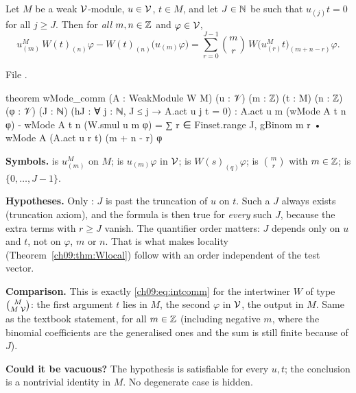 \begin{theorem}\label{ch09:thm:Wcomm}
Let $M$ be a weak $\mathcal{V}$-module, $u\in\mathcal{V}$, $t\in M$, and let $J\in{\mathbb{N}}$ be such that
$u_{(j)}t=0$ for all $j\ge J$. Then for \emph{all} $m,n\in{\mathbb{Z}}$ and $\varphi\in\mathcal{V}$,
\begin{equation}\label{ch09:eq:Wcomm}
u^M_{(m)}\,W(t)_{(n)}\varphi-W(t)_{(n)}\big(u_{(m)}\varphi\big)
=\sum_{r=0}^{J-1}\binom{m}{r}\,W\big(u^M_{(r)}t\big)_{(m+n-r)}\varphi .
\end{equation}
\end{theorem}
\noindent File .
\begin{leancode}
theorem wMode_comm (A : WeakModule W M) (u : 𝒱) (m : ℤ) (t : M) (n : ℤ) (φ : 𝒱) (J : ℕ)
    (hJ : ∀ j : ℕ, J ≤ j → A.act u j t = 0) :
    A.act u m (wMode A t n φ) - wMode A t n (W.smul u m φ)
      = ∑ r ∈ Finset.range J, gBinom m r • wMode A (A.act u r t) (m + n - r) φ
\end{leancode}

\begin{dictionary}
\textbf{Symbols.}  is $u^M_{(m)}$ on $M$;  is $u_{(m)}\varphi$
in $\mathcal{V}$;  is $W(s)_{(q)}\varphi$;  is $\binom{m}{r}$
with $m\in{\mathbb{Z}}$;  is $\{0,\dots,J-1\}$.

\textbf{Hypotheses.} Only : $J$ is past the truncation of $u$ on $t$. Such a $J$ always
exists (truncation axiom), and the formula is then true for \emph{every} such $J$, because the
extra terms with $r\ge J$ vanish. The quantifier order matters: $J$ depends only on $u$ and $t$,
not on $\varphi$, $m$ or $n$. That is what makes locality (Theorem~\ref{ch09:thm:Wlocal}) follow
with an order independent of the test vector.

\textbf{Comparison.} This is exactly \eqref{ch09:eq:intcomm} for the intertwiner $W$ of type
$\binom{M}{M\;\mathcal{V}}$: the first argument $t$ lies in $M$, the second $\varphi$ in
$\mathcal{V}$, the output in $M$. Same as the textbook statement, for all $m\in{\mathbb{Z}}$ (including
negative $m$, where the binomial coefficients are the generalised ones and the sum is still
finite because of $J$).

\textbf{Could it be vacuous?} The hypothesis is satisfiable for every $u,t$; the conclusion is a
nontrivial identity in $M$. No degenerate case is hidden.
\end{dictionary}

